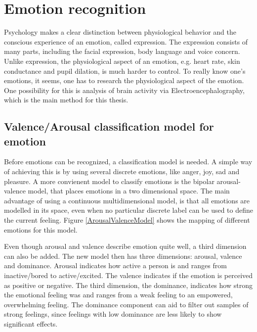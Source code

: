 \section{Emotion recognition}

Psychology makes a clear distinction between physiological behavior and the conscious experience of an emotion, called expression\cite{ExtendedPaper}. The expression consists of many parts, including the facial expression, body language and voice concern. Unlike expression, the physiological aspect of an emotion, e.g. heart rate, skin conductance and pupil dilation, is much harder to control. To really know one's emotions, it seems, one has to research the physiological aspect of the emotion. One possibility for this is analysis of brain activity via Electroencephalography\cite{EEGDatasets}, which is the main method for this thesis.

\subsection{Valence/Arousal classification model for emotion}
\label{valarrdomspace}

Before emotions can be recognized, a classification model is needed. A simple way of achieving this is by using several discrete emotions, like anger, joy, sad and pleasure. A more convienent model to classify emotions is the bipolar arousal-valence model\cite{ExtendedPaper,RealTimeEEGEmotion}, that places emotions in a two dimensional space. The main advantage of using a continuous multidimensional model, is that all emotions are modelled in its space, even when no particular discrete label can be used to define the current feeling. Figure \ref{ArousalValenceModel} shows the mapping of different emotions for this model. 

\npar
Even though arousal and valence describe emotion quite well, a third dimension can also be added. The new model then has three dimensions: arousal, valence and dominance. Arousal indicates how active a person is and ranges from inactive/bored to active/excited. The valence indicates if the emotion is perceived as positive or negative. The third dimension, the dominance, indicates how strong the emotional feeling was and ranges from a weak feeling to an empowered, overwhelming feeling. The dominance component can aid to filter out samples of strong feelings, since feelings with low dominance are less likely to show significant effects.


